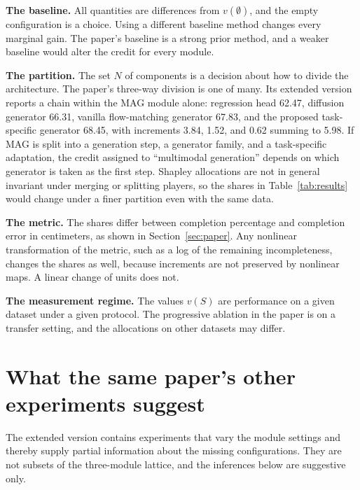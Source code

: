 \documentclass[11pt]{article}
\theoremstyle{plain}
\theoremstyle{remark}
\begin{document}
\textbf{The baseline.} All quantities are differences from $v(\emptyset)$, and the empty configuration is a choice. Using a different baseline method changes every marginal gain. The paper's baseline is a strong prior method, and a weaker baseline would alter the credit for every module.

\textbf{The partition.} The set $N$ of components is a decision about how to divide the architecture. The paper's three-way division is one of many. Its extended version reports a chain within the MAG module alone: regression head 62.47, diffusion generator 66.31, vanilla flow-matching generator 67.83, and the proposed task-specific generator 68.45, with increments 3.84, 1.52, and 0.62 summing to 5.98. If MAG is split into a generation step, a generator family, and a task-specific adaptation, the credit assigned to ``multimodal generation'' depends on which generator is taken as the first step. Shapley allocations are not in general invariant under merging or splitting players, so the shares in Table~\ref{tab:results} would change under a finer partition even with the same data.

\textbf{The metric.} The shares differ between completion percentage and completion error in centimeters, as shown in Section~\ref{sec:paper}. Any nonlinear transformation of the metric, such as a log of the remaining incompleteness, changes the shares as well, because increments are not preserved by nonlinear maps. A linear change of units does not.

\textbf{The measurement regime.} The values $v(S)$ are performance on a given dataset under a given protocol. The progressive ablation in the paper is on a transfer setting, and the allocations on other datasets may differ.

\section{What the same paper's other experiments suggest}\label{sec:more}

The extended version contains experiments that vary the module settings and thereby supply partial information about the missing configurations. They are not subsets of the three-module lattice, and the inferences below are suggestive only.
\end{document}
